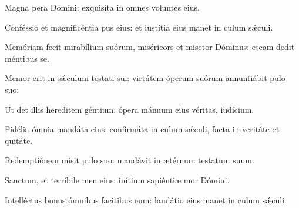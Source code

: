 \item {}

\item Magna pera Dómini:\psstar{} exquisíta in omnes voluntes eius.

\item Conféssio et magnificéntia pus eius:\psstar{} et iustítia eius manet in culum sǽculi.

\item Memóriam fecit mirabílium suórum,\pscross{} miséricors et misetor Dóminus:\psstar{} escam dedit méntibus se.

\item Memor erit in sǽculum testati sui:\psstar{} virtútem óperum suórum annuntiábit pulo suo:

\item Ut det illis hereditem géntium:\psstar{} ópera mánuum eius véritas,  iudícium.

\item Fidélia ómnia mandáta eius:\pscross{} confirmáta in culum sǽculi,\psstar{} facta in veritáte et quitáte.

\item Redemptiónem misit pulo suo:\psstar{} mandávit in ætérnum testatum suum.

\item Sanctum, et terríbile men eius:\psstar{} inítium sapiéntiæ mor Dómini.

\item Intelléctus bonus ómnibus facitibus eum:\psstar{} laudátio eius manet in culum sǽculi.